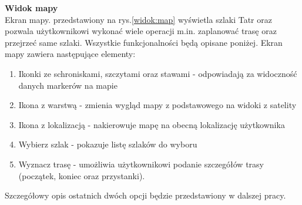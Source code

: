 \noindent
\textbf{Widok mapy} \\
\indent Ekran mapy. przedstawiony na rys.\ref{widok:map} wyświetla szlaki Tatr oraz pozwala użytkownikowi wykonać wiele operacji m.in. zaplanować trasę oraz przejrzeć same szlaki. Wszystkie funkcjonalności będą opisane poniżej.
Ekran mapy zawiera następujące elementy:
\begin{enumerate}
    \item Ikonki ze schroniskami, szczytami oraz stawami - odpowiadają za widoczność danych markerów na mapie
    \item Ikona z warstwą - zmienia wygląd mapy z podstawowego na widoki z satelity
    \item Ikona z lokalizacją - nakierowuje mapę na obecną lokalizację użytkownika
    \item Wybierz szlak - pokazuje listę szlaków do wyboru
    \item Wyznacz trasę - umożliwia użytkownikowi podanie szczegółów trasy (początek, koniec oraz przystanki).
\end{enumerate}
Szczegółowy opis ostatnich dwóch opcji będzie przedstawiony w dalszej pracy.


